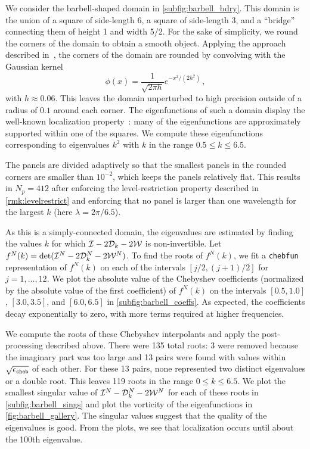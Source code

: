 We consider the barbell-shaped domain in \cref{subfig:barbell_bdry}.
This domain is the union of a square of side-length 6,
a square of side-length 3, and a ``bridge'' connecting
them of height 1 and width 5/2.
%
For the sake of simplicity, we round the corners of the domain
to obtain a smooth object.
%
Applying the approach described in~\cite{epstein2016smoothed},
the corners of the domain are rounded by convolving with
the Gaussian kernel
\begin{equation}
  \nonumber
\phi(x) = \frac{1}{\sqrt{2\pi h}} e^{-x^2/(2 h^2)} \, ,
\end{equation}
with $h\approx 0.06$. This leaves the domain unperturbed
to high precision outside of a radius of $0.1$ around
each corner.
%
The eigenfunctions of such a domain display the well-known
localization property~\cite{trefethen2006computed}:
many of the eigenfunctions are approximately supported
within one of the squares.
%
We compute these eigenfunctions corresponding to
eigenvalues $k^2$ with $k$ in the range
$0.5 \leq k \leq 6.5$.

%
The panels are divided adaptively so that the smallest
panels in the rounded corners are smaller than $10^{-2}$,
which keeps the panels relatively flat.
%
This results in $N_p = 412$ after enforcing the
level-restriction property described in
\cref{rmk:levelrestrict}
and enforcing that no panel is larger than
one wavelength for the largest $k$
(here $\lambda=2\pi/6.5$).

As this is a simply-connected domain,
the eigenvalues are estimated by finding the values
$k$ for which $\mathcal I-2{\mathcal D}_{k}-2{\mathcal W}$ is non-invertible.
%
Let $f^N(k) = \det (\mathcal I^N-2{\mathcal D}_{k}^N-2{\mathcal W}^N)$.
To find the roots of $f^N(k)$, we fit a \texttt{chebfun}
representation of $f^N(k)$ on each of the intervals
$[j/2,(j+1)/2]$ for $j = 1,\ldots,12$.
%
We plot the absolute value of the Chebyshev coefficients
(normalized by the absolute value of the first coefficient)
of $f^N(k)$ on the intervals $[0.5,1.0]$, $[3.0,3.5]$,
and $[6.0,6.5]$ in \cref{subfig:barbell_coeffs}.
%
As expected, the coefficients decay exponentially
to zero, with more terms required at higher
frequencies.
%

We compute the roots of these Chebyshev interpolants
and apply the post-processing described above.
%
There were 135 total roots: 3 were removed because
the imaginary part was too large and 13 pairs were found
with values within $\sqrt{{\epsilon_{\texttt{cheb}}}}$ of each other.
%
For these 13 pairs, none represented two distinct
eigenvalues or a double root.
%
This leaves 119 roots in the range $0\leq k \leq 6.5$.
%
We plot the smallest singular value of
$\mathcal I^N-{\mathcal D}_{k}^N-2{\mathcal W}^N$ for each of these roots in
\cref{subfig:barbell_sings}
and plot the vorticity of the eigenfunctions
in \cref{fig:barbell_gallery}.
%
The singular values suggest that the quality of the
eigenvalues is good.
From the plots, we see that localization occurs
until about the 100th eigenvalue.

